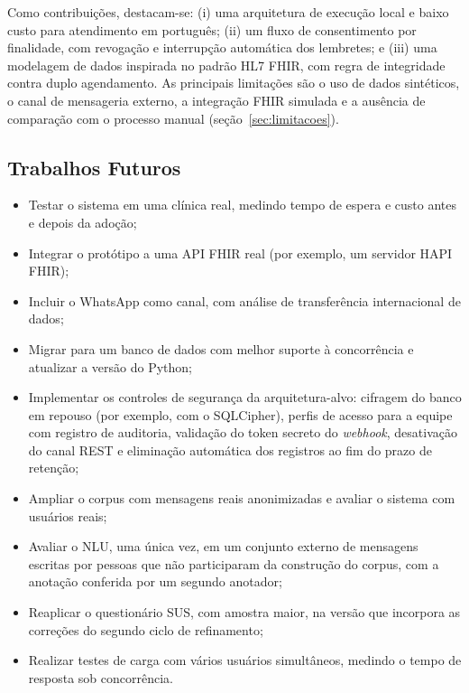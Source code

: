 \documentclass[12pt,a4paper]{extarticle}
\begin{document}
Como contribuições, destacam-se: (i) uma arquitetura de execução local e baixo custo para atendimento em português; (ii) um fluxo de consentimento por finalidade, com revogação e interrupção automática dos lembretes; e (iii) uma modelagem de dados inspirada no padrão HL7 FHIR, com regra de integridade contra duplo agendamento. As principais limitações são o uso de dados sintéticos, o canal de mensageria externo, a integração FHIR simulada e a ausência de comparação com o processo manual (seção~\ref{sec:limitacoes}).

\subsection{Trabalhos Futuros}
\label{sec:trabalhos-futuros}

\begin{itemize}
    \item Testar o sistema em uma clínica real, medindo tempo de espera e custo antes e depois da adoção;
    \item Integrar o protótipo a uma API FHIR real (por exemplo, um servidor HAPI FHIR);
    \item Incluir o WhatsApp como canal, com análise de transferência internacional de dados;
    \item Migrar para um banco de dados com melhor suporte à concorrência e atualizar a versão do Python;
    \item Implementar os controles de segurança da arquitetura-alvo: cifragem do banco em repouso (por exemplo, com o SQLCipher), perfis de acesso para a equipe com registro de auditoria, validação do token secreto do \textit{webhook}, desativação do canal REST e eliminação automática dos registros ao fim do prazo de retenção;
    \item Ampliar o corpus com mensagens reais anonimizadas e avaliar o sistema com usuários reais;
    \item Avaliar o NLU, uma única vez, em um conjunto externo de mensagens escritas por pessoas que não participaram da construção do corpus, com a anotação conferida por um segundo anotador;
    \item Reaplicar o questionário SUS, com amostra maior, na versão que incorpora as correções do segundo ciclo de refinamento;
    \item Realizar testes de carga com vários usuários simultâneos, medindo o tempo de resposta sob concorrência.
\end{itemize}

\newpage
\end{document}
